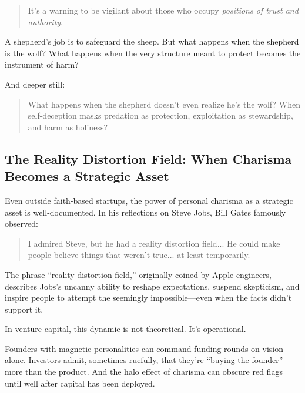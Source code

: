 \begin{tcolorbox}[colback=gray!10!white, colframe=gray!50!black, breakable, title={Philosophical Sidebar: Wolves in Shepherd’s Clothing}]
    \begin{quote}
    It’s a warning to be vigilant about those who occupy \textit{positions of trust and authority}.
    \end{quote}
    
    A shepherd’s job is to safeguard the sheep.  
    But what happens when the shepherd is the wolf?  
    What happens when the very structure meant to protect becomes the instrument of harm?
    
    \medskip
    
    And deeper still:
    
    \begin{quote}
    What happens when the shepherd doesn’t even realize he’s the wolf?  
    When self-deception masks predation as protection, exploitation as stewardship, and harm as holiness?
    \end{quote}
    
    \end{tcolorbox}
   
    
    \subsection{The Reality Distortion Field: When Charisma Becomes a Strategic Asset}

    Even outside faith-based startups, the power of personal charisma as a strategic asset is well-documented. In his reflections on Steve Jobs, Bill Gates famously observed:
    
    \begin{quote}
    I admired Steve, but he had a reality distortion field... He could make people believe things that weren’t true... at least temporarily.
    \end{quote}
    
    The phrase “reality distortion field,” originally coined by Apple engineers, describes Jobs’s uncanny ability to reshape expectations, suspend skepticism, and inspire people to attempt the seemingly impossible—even when the facts didn’t support it.
    
    In venture capital, this dynamic is not theoretical.  
    It’s operational.
    
    Founders with magnetic personalities can command funding rounds on vision alone.  
    Investors admit, sometimes ruefully, that they’re “buying the founder” more than the product.  
    And the halo effect of charisma can obscure red flags until well after capital has been deployed.
    
